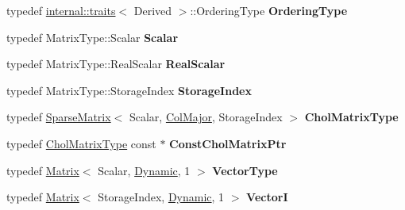 \begin{DoxyCompactItemize}
typedef \hyperlink{struct_eigen_1_1internal_1_1traits}{internal\+::traits}$<$ Derived $>$\+::Ordering\+Type {\bfseries Ordering\+Type}
\item 
\mbox{\label{group___sparse_cholesky___module_a5bbf431a4e3fa0484560e206749cea02}} 
typedef Matrix\+Type\+::\+Scalar {\bfseries Scalar}
\item 
\mbox{\label{group___sparse_cholesky___module_a14a24573a05a0653ea8e4c7a6616d544}} 
typedef Matrix\+Type\+::\+Real\+Scalar {\bfseries Real\+Scalar}
\item 
\mbox{\label{group___sparse_cholesky___module_a7d5ace38d212f98e659bfdaf947372cc}} 
typedef Matrix\+Type\+::\+Storage\+Index {\bfseries Storage\+Index}
\item 
\mbox{\label{group___sparse_cholesky___module_addfb5032ff8efea57e3576d96326e822}} 
typedef \hyperlink{group___sparse_core___module_class_eigen_1_1_sparse_matrix}{Sparse\+Matrix}$<$ Scalar, \hyperlink{group__enums_ggaacded1a18ae58b0f554751f6cdf9eb13a0cbd4bdd0abcfc0224c5fcb5e4f6669a}{Col\+Major}, Storage\+Index $>$ {\bfseries Chol\+Matrix\+Type}
\item 
\mbox{\label{group___sparse_cholesky___module_a2980c8f7ae5c6c19c4f2fc428be249e4}} 
typedef \hyperlink{group___sparse_core___module}{Chol\+Matrix\+Type} const  $\ast$ {\bfseries Const\+Chol\+Matrix\+Ptr}
\item 
\mbox{\label{group___sparse_cholesky___module_a9ac3cfb0b045fd84e4fe6bfcd627f582}} 
typedef \hyperlink{group___core___module_class_eigen_1_1_matrix}{Matrix}$<$ Scalar, \hyperlink{namespace_eigen_ad81fa7195215a0ce30017dfac309f0b2}{Dynamic}, 1 $>$ {\bfseries Vector\+Type}
\item 
\mbox{\label{group___sparse_cholesky___module_a60a6f0c73dfa90d8a5b679dd0469374a}} 
typedef \hyperlink{group___core___module_class_eigen_1_1_matrix}{Matrix}$<$ Storage\+Index, \hyperlink{namespace_eigen_ad81fa7195215a0ce30017dfac309f0b2}{Dynamic}, 1 $>$ {\bfseries VectorI}
\end{DoxyCompactItemize}
